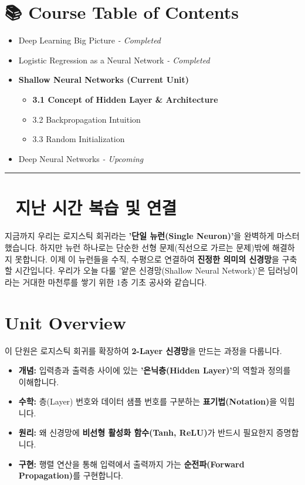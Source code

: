 \documentclass[11pt,a4paper]{book}
\theoremstyle{definition}
\begin{document}
\section*{📚 Course Table of Contents}
\begin{itemize}
    \item[Chapter 1.] Deep Learning Big Picture \textit{- Completed}
    \item[Chapter 2.] Logistic Regression as a Neural Network \textit{- Completed}
    \item[\textbf{Chapter 3.}] \textbf{Shallow Neural Networks (Current Unit)}
    \begin{itemize}
        \item \textbf{3.1 Concept of Hidden Layer \& Architecture}
        \item 3.2 Backpropagation Intuition
        \item 3.3 Random Initialization
    \end{itemize}
    \item[Chapter 4.] Deep Neural Networks \textit{- Upcoming}
\end{itemize}

\vspace{0.5cm}
\hrule
\vspace{0.5cm}

\section*{🔗 지난 시간 복습 및 연결}
지금까지 우리는 로지스틱 회귀라는 \textbf{'단일 뉴런(Single Neuron)'}을 완벽하게 마스터했습니다. 하지만 뉴런 하나로는 단순한 선형 문제(직선으로 가르는 문제)밖에 해결하지 못합니다.
이제 이 뉴런들을 수직, 수평으로 연결하여 \textbf{진정한 의미의 신경망}을 구축할 시간입니다. 우리가 오늘 다룰 '얕은 신경망(Shallow Neural Network)'은 딥러닝이라는 거대한 마천루를 쌓기 위한 1층 기초 공사와 같습니다.

\section{Unit Overview}
\begin{summarybox}[title={핵심 목표}]
이 단원은 로지스틱 회귀를 확장하여 \textbf{2-Layer 신경망}을 만드는 과정을 다룹니다.
\begin{itemize}
    \item \textbf{개념:} 입력층과 출력층 사이에 있는 \textbf{'은닉층(Hidden Layer)'}의 역할과 정의를 이해합니다.
    \item \textbf{수학:} 층(Layer) 번호와 데이터 샘플 번호를 구분하는 \textbf{표기법(Notation)}을 익힙니다.
    \item \textbf{원리:} 왜 신경망에 \textbf{비선형 활성화 함수(Tanh, ReLU)}가 반드시 필요한지 증명합니다.
    \item \textbf{구현:} 행렬 연산을 통해 입력에서 출력까지 가는 \textbf{순전파(Forward Propagation)}를 구현합니다.
\end{itemize}
\end{summarybox}
\end{document}

